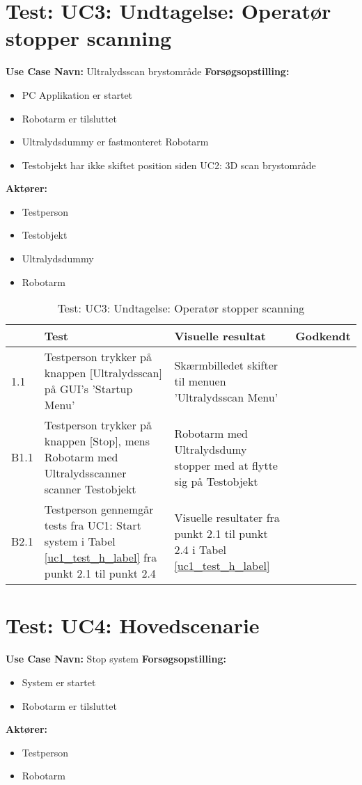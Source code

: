 
\section{Test: UC3: Undtagelse: Operatør stopper scanning}
\textbf{Use Case Navn:} Ultralydsscan brystområde \newline
\textbf{Forsøgsopstilling:}
\begin{itemize}
\item PC Applikation er startet
\item Robotarm er tilsluttet
\item Ultralydsdummy er fastmonteret Robotarm
\item Testobjekt har ikke skiftet position siden UC2: 3D scan brystområde
\end{itemize}  
\textbf{Aktører:}
\begin{itemize}
\item Testperson
\item Testobjekt
\item Ultralydsdummy
\item Robotarm
\end{itemize}  

\begin{table}[htb]
\begin{tabularx}{\textwidth}{|p{0.7cm}|X|X|p{2cm}|}
\hline
\textbf{} & \textbf{Test} & \textbf{Visuelle resultat} &\textbf{Godkendt} \\ \hline
1.1 & Testperson trykker på knappen [Ultralydsscan] på GUI's 'Startup Menu' & Skærmbilledet skifter til menuen 'Ultralydsscan Menu' & \\ \hline
B1.1 & Testperson trykker på knappen [Stop], mens Robotarm med Ultralydsscanner scanner Testobjekt & Robotarm med Ultralydsdumy stopper med at flytte sig på Testobjekt &\\\hline
B2.1 &  Testperson gennemgår tests fra UC1: Start system i Tabel \ref{uc1_test_h_label} fra punkt 2.1 til punkt 2.4  & Visuelle resultater fra punkt 2.1 til punkt 2.4 i Tabel \ref{uc1_test_h_label} & \\ \hline
\end{tabularx}
    \caption{Test: UC3: Undtagelse: Operatør stopper scanning} 
    \label{uc3_test_e_2_label}  
\end{table}
\newpage

\section{Test: UC4: Hovedscenarie}
\textbf{Use Case Navn:} Stop system \newline
\textbf{Forsøgsopstilling:}
\begin{itemize}
\item System er startet
\item Robotarm er tilsluttet
\end{itemize}  
\textbf{Aktører:}
\begin{itemize}
\item Testperson
\item Robotarm
\end{itemize}  

